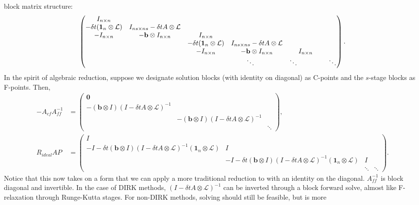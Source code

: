 \documentclass[a4paper,12pt]{article}
\begin{document}
block matrix structure:
%
\begin{align*}
\begin{pmatrix}
I_{n\times n} &  \\
-\delta t(\mathbf{1}_n \otimes \mathcal{L}) & I_{ns\times ns} - \delta t A\otimes \mathcal{L} &\\
-I_{n\times n} & -\mathbf{b}\otimes I_{n\times n} & I_{n\times n} \\ 
& & -\delta t(\mathbf{1}_n \otimes \mathcal{L}) & I_{ns\times ns} - \delta t A\otimes \mathcal{L} &  \\
& & -I_{n\times n} & -\mathbf{b}\otimes I_{n\times n} & I_{n\times n} \\
&&& \ddots\text{\hspace{4ex}}  & \ddots\text{\hspace{8ex}}  & \ddots
\end{pmatrix}.
\end{align*}
%
In the spirit of algebraic reduction, suppose we designate solution blocks (with identity on diagonal) as C-points and
the $s$-stage blocks as F-points. Then,
%
{\footnotesize
\begin{align*}
-A_{cf}A_{ff}^{-1} & = \begin{pmatrix} \mathbf{0} \\ -(\mathbf{b}\otimes I )(I - \delta tA\otimes \mathcal{L})^{-1} \\
&  -(\mathbf{b}\otimes I) (I - \delta tA\otimes \mathcal{L})^{-1} \\ & & \ddots \end{pmatrix} , \\
R_{ideal}AP & =  \begin{pmatrix} I \\ -I -\delta t(\mathbf{b}\otimes I )(I - \delta tA\otimes \mathcal{L})^{-1}(\mathbf{1}_n \otimes \mathcal{L})  & I \\
& -I - \delta t(\mathbf{b}\otimes I )(I - \delta tA\otimes \mathcal{L})^{-1}(\mathbf{1}_n \otimes \mathcal{L})  & I \\ & & \ddots & \ddots \end{pmatrix}.
\end{align*}
%
}Notice that this now takes on a form that we can apply a more traditional reduction to with an identity on the diagonal. $A_{ff}^{-1}$ is
block diagonal and invertible. In the case of DIRK methods, $ (I - \delta tA\otimes \mathcal{L})^{-1} $ can be inverted through a block
forward solve, almost like F-relaxation through Runge-Kutta stages. For non-DIRK methods, solving should still be feasible, but is more
\end{document}
